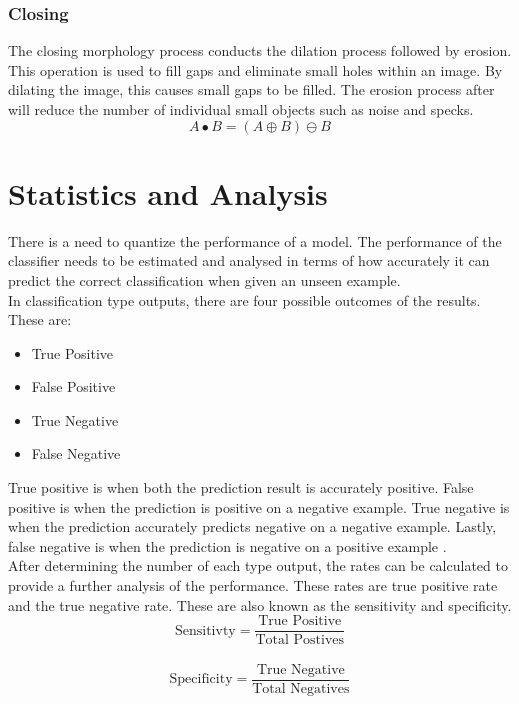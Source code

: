 \subsubsection{Closing}
The closing morphology process conducts the dilation process followed by erosion. This operation is used to fill gaps and eliminate small holes within an image. By dilating the image, this causes small gaps to be filled. The erosion process after will reduce the number of individual small objects such as noise and specks.
\begin{equation}
A \bullet B = (A \oplus B) \ominus B
\label{eq:close}
\end{equation}

\section{Statistics and Analysis}
There is a need to quantize the performance of a model. The performance of the classifier needs to be estimated and analysed in terms of how accurately it can predict the correct classification when given an unseen example.
\\[1\baselineskip]
In classification type outputs, there are four possible outcomes of the results. These are:
\begin{itemize}
	\item True Positive
	\item False Positive
	\item True Negative
	\item False Negative
\end{itemize} 
True positive is when both the prediction result is accurately positive. False positive is when the prediction is positive on a negative example. True negative is when the prediction accurately predicts negative on a negative example. Lastly, false negative is when the prediction is negative on a positive example \cite{ref:ml_1}. 
\\[1\baselineskip]
After determining the number of each type output, the rates can be calculated to provide a further analysis of the performance. These rates are true positive rate and the true negative rate. These are also known as the sensitivity and specificity. 
\begin{equation}
\textrm{Sensitivty} = \frac{\textrm{True Positive}}{\textrm{Total Postives}}
\label{eq:sensitivity}
\end{equation}
\\
\begin{equation}
\textrm{Specificity} = \frac{\textrm{True Negative}}{\textrm{Total Negatives}}
\label{eq:specificity}
\end{equation}
